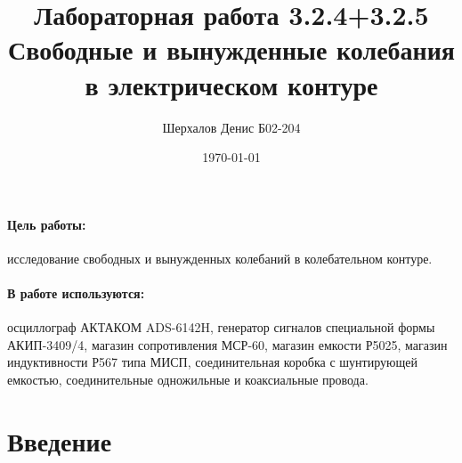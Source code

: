 \documentclass[a4paper,12pt]{article}
\author{Шерхалов Денис Б02-204}
\title{Лабораторная работа 3.2.4+3.2.5 \\
	\textbf{Свободные и вынужденные колебания в электрическом контуре}}
\date{\today}
\theoremstyle{definition}
\begin{document}
	
{\Large \maketitle}

\paragraph*{Цель работы:} исследование свободных и вынужденных колебаний в
колебательном контуре.
\paragraph*{В работе используются:} осциллограф АКТАКОМ ADS-6142H, генератор сигналов специальной формы АКИП-3409/4, магазин сопротивления МСР-60, магазин емкости Р5025, магазин индуктивности Р567 типа
МИСП, соединительная коробка с шунтирующей емкостью, соединительные одножильные и коаксиальные провода.

\section{Введение}
\end{document}
